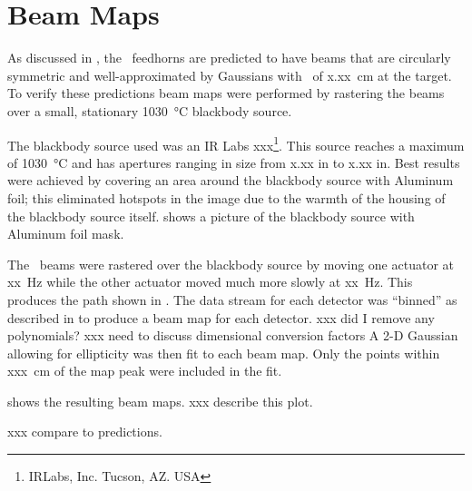 \section{Beam Maps}

As discussed in , the \Imager\ feedhorns are predicted to have beams that are circularly symmetric and well-approximated by Gaussians with \FWHM\ of x.xx~cm at the target.
To verify these predictions beam maps were performed by rastering the beams over a small, stationary \SI{1030}{\celsius} blackbody source.

The blackbody source used was an IR Labs xxx\footnote{IRLabs, Inc. Tucson, AZ. USA}.
This source reaches a maximum of \SI{1030}{\celsius} and has apertures ranging in size from x.xx in to x.xx in.
Best results were achieved by covering an area around the blackbody source with Aluminum foil; this eliminated hotspots in the image due to the warmth of the housing of the blackbody source itself.
 shows a picture of the blackbody source with Aluminum foil mask.

The \Imager\ beams were rastered over the blackbody source by moving one actuator at xx~Hz while the other actuator moved much more slowly at xx~Hz.
This produces the path shown in .
The data stream for each detector was ``binned'' as described in  to produce a beam map for each detector.
xxx did I remove any polynomials?
xxx need to discuss dimensional conversion factors
A 2-D Gaussian allowing for ellipticity was then fit to each beam map.
Only the points within xxx~cm of the map peak were included in the fit.

 shows the resulting beam maps.
xxx describe this plot.

xxx compare to predictions.
